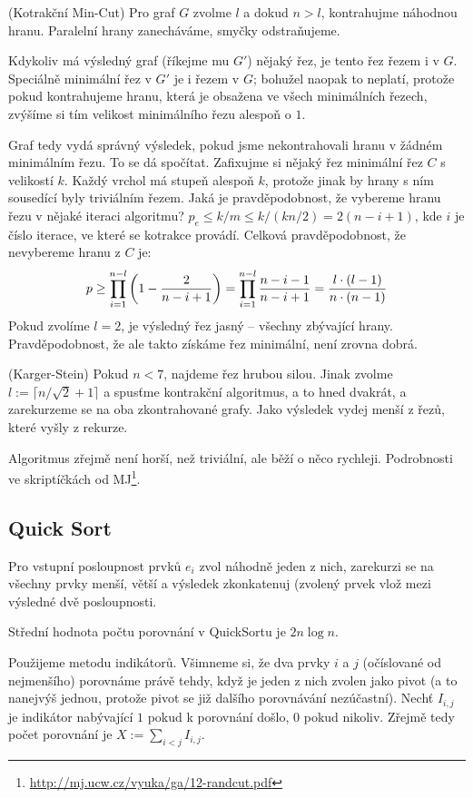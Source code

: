 \alg (Kotrakční Min-Cut) Pro graf $G$ zvolme $l$ a dokud $n > l$, kontrahujme
náhodnou hranu. Paralelní hrany zanecháváme, smyčky odstraňujeme.

Kdykoliv má výsledný graf (říkejme mu $G'$) nějaký řez, je tento řez řezem i v
$G$. Speciálně minimální řez v $G'$ je i řezem v $G$; bohužel naopak to neplatí,
protože pokud kontrahujeme hranu, která je obsažena ve všech minimálních řezech,
zvýšíme si tím velikost minimálního řezu alespoň o $1$. 

Graf tedy vydá správný výsledek, pokud jsme nekontrahovali hranu v žádném
minimálním řezu. To se dá spočítat. Zafixujme si nějaký řez minimální řez $C$ s
velikostí $k$. Každý vrchol má stupeň alespoň $k$, protože jinak by hrany s ním
sousedící byly triviálním řezem. Jaká je pravděpodobnost, že vybereme hranu
řezu v nějaké iteraci algoritmu? $p_e \leq k/m \leq k/(kn/2) = 2(n-i+1)$, kde
$i$ je číslo iterace, ve které se kotrakce provádí. Celková pravděpodobnost, že
nevybereme hranu z $C$ je:
\begin{align}
	p \geq \prod_{i=1}^{n-l} \left( 1 - {2 \over n-i+1}\right) = 
	\prod_{i=1}^{n-l}{n-i-1 \over n-i+1}
	= {l \cdot (l-1) \over n \cdot (n-1)}
\end{align}
Pokud zvolíme $l=2$, je výsledný řez jasný -- všechny zbývající hrany.
Pravděpodobnost, že ale takto získáme řez minimální, není zrovna dobrá.

\alg (Karger-Stein) Pokud $n < 7$, najdeme řez hrubou silou. Jinak zvolme $l :=
\lceil n/\sqrt 2 +1\rceil$ a spusťme kontrakční algoritmus, a to hned dvakrát, a
zarekurzeme se na oba zkontrahované grafy. Jako výsledek vydej menší z řezů,
které vyšly z rekurze.

Algoritmus zřejmě není horší, než triviální, ale běží o něco rychleji.
Podrobnosti ve skriptíčkách od
MJ\footnote{\url{http://mj.ucw.cz/vyuka/ga/12-randcut.pdf}}.

\subsection{Quick Sort}

\alg Pro vstupní posloupnost prvků $e_i$ zvol náhodně jeden z nich, zarekurzi se
na všechny prvky menší, větší a výsledek zkonkatenuj (zvolený prvek vlož mezi
výsledné dvě posloupnosti.

\vt Střední hodnota počtu porovnání v QuickSortu je $2n \log n$.

\dk Použijeme metodu indikátorů. Všimneme si, že dva prvky $i$ a $j$ (očíslované
od nejmenšího) porovnáme právě tehdy, když je jeden z nich zvolen jako pivot (a
to nanejvýš jednou, protože pivot se již dalšího porovnávání nezúčastní). Nechť
$I_{i,j}$ je indikátor nabývající $1$ pokud k porovnání došlo, $0$ pokud
nikoliv. Zřejmě tedy počet porovnání je $X := \sum_{i < j} I_{i,j}$.

